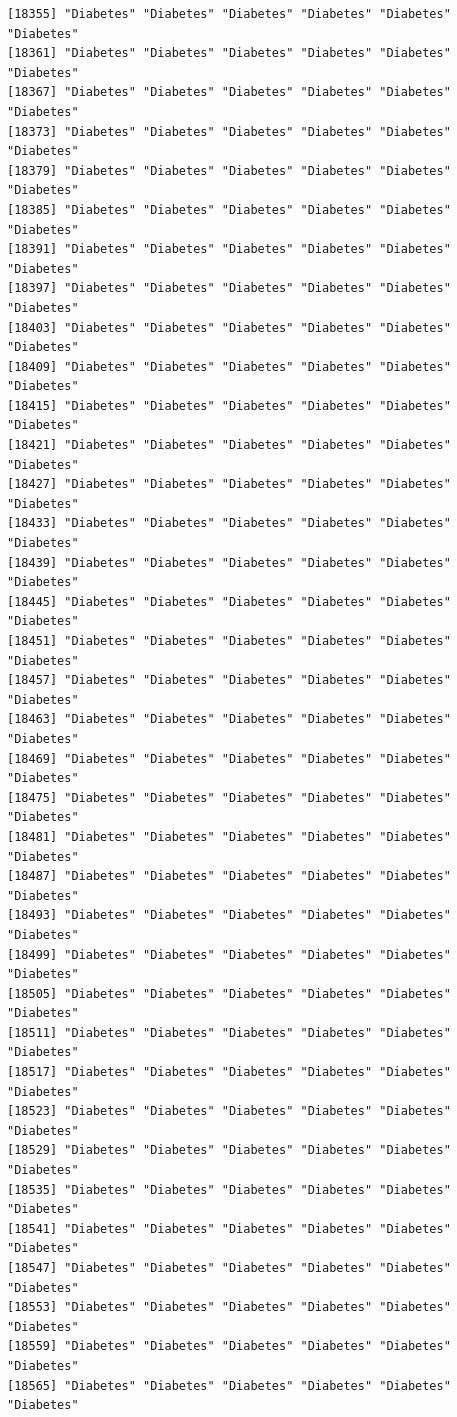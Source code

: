 \documentclass[
  letterpaper,
  DIV=11,
  numbers=noendperiod]{scrartcl}
\begin{document}
\begin{verbatim}
[18355] "Diabetes" "Diabetes" "Diabetes" "Diabetes" "Diabetes" "Diabetes"
[18361] "Diabetes" "Diabetes" "Diabetes" "Diabetes" "Diabetes" "Diabetes"
[18367] "Diabetes" "Diabetes" "Diabetes" "Diabetes" "Diabetes" "Diabetes"
[18373] "Diabetes" "Diabetes" "Diabetes" "Diabetes" "Diabetes" "Diabetes"
[18379] "Diabetes" "Diabetes" "Diabetes" "Diabetes" "Diabetes" "Diabetes"
[18385] "Diabetes" "Diabetes" "Diabetes" "Diabetes" "Diabetes" "Diabetes"
[18391] "Diabetes" "Diabetes" "Diabetes" "Diabetes" "Diabetes" "Diabetes"
[18397] "Diabetes" "Diabetes" "Diabetes" "Diabetes" "Diabetes" "Diabetes"
[18403] "Diabetes" "Diabetes" "Diabetes" "Diabetes" "Diabetes" "Diabetes"
[18409] "Diabetes" "Diabetes" "Diabetes" "Diabetes" "Diabetes" "Diabetes"
[18415] "Diabetes" "Diabetes" "Diabetes" "Diabetes" "Diabetes" "Diabetes"
[18421] "Diabetes" "Diabetes" "Diabetes" "Diabetes" "Diabetes" "Diabetes"
[18427] "Diabetes" "Diabetes" "Diabetes" "Diabetes" "Diabetes" "Diabetes"
[18433] "Diabetes" "Diabetes" "Diabetes" "Diabetes" "Diabetes" "Diabetes"
[18439] "Diabetes" "Diabetes" "Diabetes" "Diabetes" "Diabetes" "Diabetes"
[18445] "Diabetes" "Diabetes" "Diabetes" "Diabetes" "Diabetes" "Diabetes"
[18451] "Diabetes" "Diabetes" "Diabetes" "Diabetes" "Diabetes" "Diabetes"
[18457] "Diabetes" "Diabetes" "Diabetes" "Diabetes" "Diabetes" "Diabetes"
[18463] "Diabetes" "Diabetes" "Diabetes" "Diabetes" "Diabetes" "Diabetes"
[18469] "Diabetes" "Diabetes" "Diabetes" "Diabetes" "Diabetes" "Diabetes"
[18475] "Diabetes" "Diabetes" "Diabetes" "Diabetes" "Diabetes" "Diabetes"
[18481] "Diabetes" "Diabetes" "Diabetes" "Diabetes" "Diabetes" "Diabetes"
[18487] "Diabetes" "Diabetes" "Diabetes" "Diabetes" "Diabetes" "Diabetes"
[18493] "Diabetes" "Diabetes" "Diabetes" "Diabetes" "Diabetes" "Diabetes"
[18499] "Diabetes" "Diabetes" "Diabetes" "Diabetes" "Diabetes" "Diabetes"
[18505] "Diabetes" "Diabetes" "Diabetes" "Diabetes" "Diabetes" "Diabetes"
[18511] "Diabetes" "Diabetes" "Diabetes" "Diabetes" "Diabetes" "Diabetes"
[18517] "Diabetes" "Diabetes" "Diabetes" "Diabetes" "Diabetes" "Diabetes"
[18523] "Diabetes" "Diabetes" "Diabetes" "Diabetes" "Diabetes" "Diabetes"
[18529] "Diabetes" "Diabetes" "Diabetes" "Diabetes" "Diabetes" "Diabetes"
[18535] "Diabetes" "Diabetes" "Diabetes" "Diabetes" "Diabetes" "Diabetes"
[18541] "Diabetes" "Diabetes" "Diabetes" "Diabetes" "Diabetes" "Diabetes"
[18547] "Diabetes" "Diabetes" "Diabetes" "Diabetes" "Diabetes" "Diabetes"
[18553] "Diabetes" "Diabetes" "Diabetes" "Diabetes" "Diabetes" "Diabetes"
[18559] "Diabetes" "Diabetes" "Diabetes" "Diabetes" "Diabetes" "Diabetes"
[18565] "Diabetes" "Diabetes" "Diabetes" "Diabetes" "Diabetes" "Diabetes"

\end{verbatim}
\end{document}

